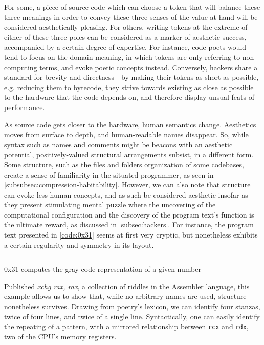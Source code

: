 For some, a piece of source code which can choose a token that will balance these three meanings in order to convey these three senses of the value at hand will be considered aesthetically pleasing. For others, writing tokens at the extreme of either of these three poles can be considered as a marker of aesthetic success, accompanied by a certain degree of expertise. For instance, code poets would tend to focus on the domain meaning, in which tokens are only referring to non-computing terms, and evoke poetic concepts instead. Conversely, hackers share a standard for brevity and directness—by making their tokens as short as possible, e.g. reducing them to bytecode, they strive towards existing as close as possible to the hardware that the code depends on, and therefore display unsual feats of performance.

As source code gets closer to the hardware, human semantics change. Aesthetics moves from surface to depth, and human-readable names disappear. So, while syntax such as names and comments might be beacons with an aesthetic potential, positively-valued structural arrangements subsist, in a different form. Some structure, such as the files and folders organization of some codebases, create a sense of familiarity in the situated programmer, as seen in \ref{subsubsec:compression-habitability}. However, we can also note that structure can evoke less-human concepts, and as such be considered aesthetic insofar as they present stimulating mental puzzle where the uncovering of the computational configuration and the discovery of the program text's function is the ultimate reward, as discussed in \ref{subsec:hackers}. For instance, the program text presented in \ref{code:0x31} seems at first very cryptic, but nonetheless exhibits a certain regularity and symmetry in its layout.

\begin{listing}
    \inputminted{asm}{./corpus/0x31.asm}
    \caption{0x31 computes the gray code representation of a given number}
    \label{code:0x31}
\end{listing}

Published \emph{xchg rax, rax}, a collection of riddles in the Assembler language, this example allows us to show that, while no arbitrary names are used, structure nonetheless survives. Drawing from poetry's lexicon, we can identify four stanzas, twice of four lines, and twice of a single line. Syntactically, one can easily identify the repeating of a pattern, with a mirrored relationship between \lstinline{rcx} and \lstinline{rdx}, two of the CPU's memory registers.

